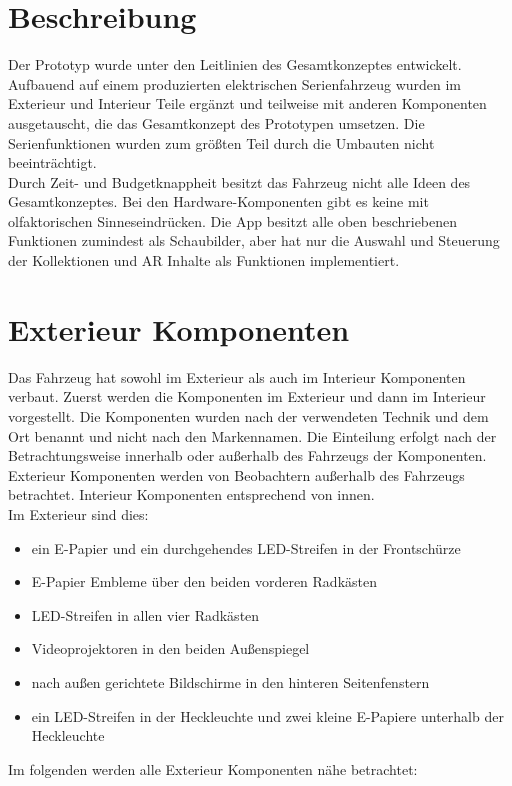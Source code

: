 \section{Beschreibung}
Der Prototyp wurde unter den Leitlinien des Gesamtkonzeptes entwickelt. Aufbauend auf einem produzierten elektrischen Serienfahrzeug wurden im Exterieur und Interieur Teile ergänzt und teilweise mit anderen Komponenten ausgetauscht, die das Gesamtkonzept des Prototypen umsetzen. Die Serienfunktionen wurden zum größten Teil durch die Umbauten nicht beeinträchtigt.\\
Durch Zeit- und Budgetknappheit besitzt das Fahrzeug nicht alle Ideen des Gesamtkonzeptes. Bei den Hardware-Komponenten gibt es keine mit olfaktorischen Sinneseindrücken. Die App besitzt alle oben beschriebenen Funktionen zumindest als Schaubilder, aber hat nur die Auswahl und Steuerung der Kollektionen und AR Inhalte als Funktionen implementiert.
\section{Exterieur Komponenten}
Das Fahrzeug hat sowohl im Exterieur als auch im Interieur Komponenten verbaut. Zuerst werden die Komponenten im Exterieur und dann im Interieur vorgestellt. Die Komponenten wurden nach der verwendeten Technik und dem Ort benannt und nicht nach den Markennamen. Die Einteilung erfolgt nach der Betrachtungsweise innerhalb oder außerhalb des Fahrzeugs der Komponenten. Exterieur Komponenten werden von Beobachtern außerhalb des Fahrzeugs betrachtet. Interieur Komponenten entsprechend von innen.\\
Im Exterieur sind dies:
\begin{itemize}
	\item ein E-Papier und ein durchgehendes LED-Streifen in der Frontschürze
	\item E-Papier Embleme über den beiden vorderen Radkästen
	\item LED-Streifen in allen vier Radkästen
	\item Videoprojektoren in den beiden Außenspiegel
	\item nach außen gerichtete Bildschirme in den hinteren Seitenfenstern
	\item ein LED-Streifen in der Heckleuchte und zwei kleine E-Papiere unterhalb der Heckleuchte
\end{itemize}
Im folgenden werden alle Exterieur Komponenten nähe betrachtet:
